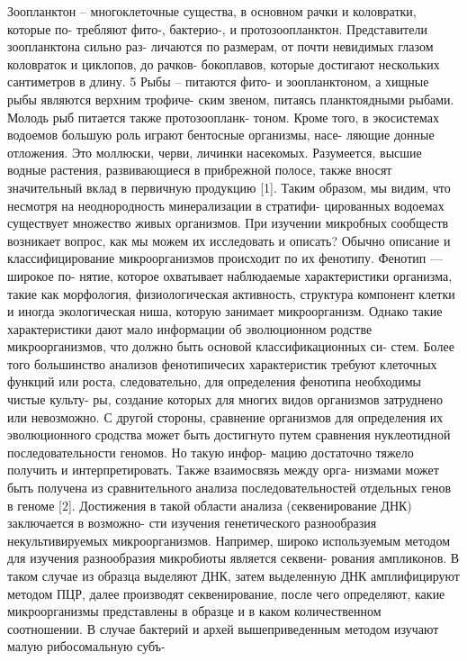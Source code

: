 Зоопланктон – многоклеточные существа, в основном рачки и коловратки, которые по-
требляют фито-, бактерио-, и протозоопланктон. Представители зоопланктона сильно раз-
личаются по размерам, от почти невидимых глазом коловраток и циклопов, до рачков-
бокоплавов, которые достигают нескольких сантиметров в длину.
5
Рыбы – питаются фито- и зоопланктоном, а хищные рыбы являются верхним трофиче-
ским звеном, питаясь планктоядными рыбами. Молодь рыб питается также протозоопланк-
тоном.
Кроме того, в экосистемах водоемов большую роль играют бентосные организмы, насе-
ляющие донные отложения. Это моллюски, черви, личинки насекомых. Разумеется, высшие
водные растения, развивающиеся в прибрежной полосе, также вносят значительный вклад
в первичную продукцию [1].
Таким образом, мы видим, что несмотря на неоднородность минерализации в стратифи-
цированных водоемах существует множество живых организмов. При изучении микробных
сообществ возникает вопрос, как мы можем их исследовать и описать? Обычно описание и
классифицирование микроорганизмов происходит по их фенотипу. Фенотип — широкое по-
нятие, которое охватывает наблюдаемые характеристики организма, такие как морфология,
физиологическая активность, структура компонент клетки и иногда экологическая ниша,
которую занимает микроорганизм. Однако такие характеристики дают мало информации об
эволюционном родстве микроорганизмов, что должно быть основой классификационных си-
стем. Более того большинство анализов фенотипичесих характеристик требуют клеточных
функций или роста, следовательно, для определения фенотипа необходимы чистые культу-
ры, создание которых для многих видов организмов затруднено или невозможно. С другой
стороны, сравнение организмов для определения их эволюционного сродства может быть
достигнуто путем сравнения нуклеотидной последовательности геномов. Но такую инфор-
мацию достаточно тяжело получить и интерпретировать. Также взаимосвязь между орга-
низмами может быть получена из сравнительного анализа последовательностей отдельных
генов в геноме [2].
Достижения в такой области анализа (секвенирование ДНК) заключается в возможно-
сти изучения генетического разнообразия некультивируемых микроорганизмов. Например,
широко используемым методом для изучения разнообразия микробиоты является секвени-
рования ампликонов. В таком случае из образца выделяют ДНК, затем выделенную ДНК
амплифицируют методом ПЦР, далее производят секвенирование, после чего определяют,
какие микроорганизмы представлены в образце и в каком количественном соотношении. В
случае бактерий и архей вышеприведенным методом изучают малую рибосомальную субъ-
